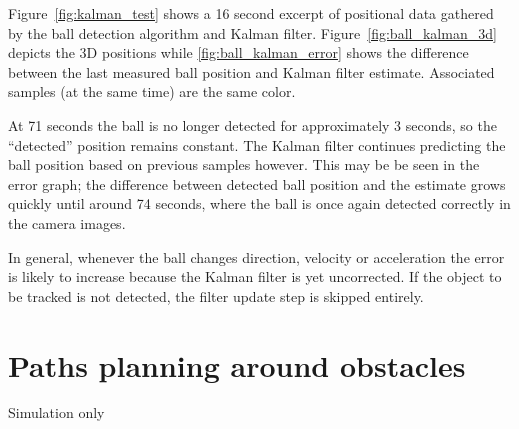 Figure~\ref{fig:kalman_test} shows a 16 second excerpt of positional data gathered by the ball detection algorithm and Kalman filter.
Figure~\ref{fig:ball_kalman_3d} depicts the 3D positions while \ref{fig:ball_kalman_error} shows the difference between the last measured ball position and Kalman filter estimate. Associated samples (at the same time) are the same color.

At 71 seconds the ball is no longer detected for approximately 3 seconds, so the ``detected'' position remains constant. The Kalman filter continues predicting the ball position based on previous samples however. This may be be seen in the error graph; the difference between detected ball position and the estimate grows quickly until around 74 seconds, where the ball is once again detected correctly in the camera images.

In general, whenever the ball changes direction, velocity or acceleration the error is likely to increase because the Kalman filter is yet uncorrected. If the object to be tracked is not detected, the filter update step is skipped entirely.


\section{Paths planning around obstacles}
Simulation only
